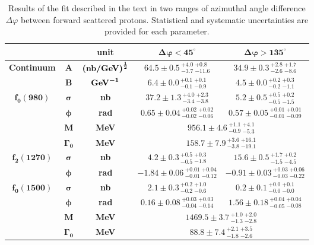 {
\renewcommand{\arraystretch}{1.5}
\begin{table}[]\centering
\begin{tabular}{ccc c c}%
~ & ~ & \bf{unit} & $\bm{\Delta\varphi<45^{\circ}}$ & $\bm{\Delta\varphi>135^{\circ}}$ \\ \hline\hline \multirow{2}{*}{\bf{Continuum}} & $\bm{A}$ & $\bm{\left(\text{\bf{nb/GeV}}\right)^{\frac{1}{2}}}$ & $64.5 \pm 0.5 \,^{+4.0}_{-3.7}\,^{+0.8}_{-11.6}$ & $34.9 \pm 0.3\,^{+2.8}_{-2.6}\,^{+1.7}_{-8.6}$ \\ %
& $\bm{B}$ & $\bm{\text{\bf{GeV}}^{-1}}$ & $6.4 \pm 0.0\,^{+0.1}_{-0.1} \,^{+0.1}_{-0.9}$ & $4.5 \pm 0.0\,^{+0.2}_{-0.2}\,^{+0.3}_{-1.1}$ \\ \hline
\multirow{4}{*}{$\bm{f_{0}(980)}$} & $\bm{\sigma}$ & \bf{nb} & $37.2 \pm 1.3 \,^{+4.0}_{-3.4}\,^{+2.3}_{-3.8}$ & $5.2 \pm 0.5\,^{+0.5}_{-0.5}\,^{+0.2}_{-1.5}$ \\
& $\bm{\phi}$ & \bf{rad} & $0.65 \pm 0.04\,^{+0.02}_{-0.02}\,^{+0.02}_{-0.06}$ & $0.57 \pm 0.05\,^{+0.01}_{-0.01}\,^{+0.01}_{-0.09}$ \\ %
& $\bm{M}$ & \bf{MeV} & \multicolumn{2}{c}{$956.1 \pm 4.6\,^{+1.1}_{-0.9} \,^{+4.1}_{-5.3}$} \\ %
& $\bm{\Gamma_{0}}$ & \bf{MeV} & \multicolumn{2}{c}{$158.7 \pm 7.9\,^{+3.6}_{-3.8} \,^{+16.1}_{-19.1}$} \\ \hline
\multirow{2}{*}{$\bm{f_{2}(1270)}$} & $\bm{\sigma}$ & \bf{nb} & $4.2 \pm 0.3 \,^{+0.5}_{-0.5}\,^{+0.3}_{-1.8}$ & $15.6 \pm 0.5\,^{+1.7}_{-1.5}\,^{+0.2}_{-4.5}$ \\ %
& $\bm{\phi}$ & \bf{rad} & $-1.84 \pm 0.06\,^{+0.01}_{-0.01}\,^{+0.04}_{-0.12}$ & $-0.91 \pm 0.03\,^{+0.03}_{-0.03}\,^{+0.06}_{-0.22}$ \\ \hline
\multirow{4}{*}{$\bm{f_{0}(1500)}$} & $\bm{\sigma}$ & \bf{nb} & $2.1 \pm 0.3 \,^{+0.2}_{-0.2}\,^{+1.0}_{-0.6}$ & $0.2 \pm 0.1\,^{+0.0}_{-0.0}\,^{+0.1}_{-0.0}$ \\ %
& $\bm{\phi}$ & \bf{rad} & $0.16 \pm 0.08\,^{+0.03}_{-0.04}\,^{+0.03}_{-0.14}$ & $1.56 \pm 0.18\,^{+0.04}_{-0.05}\,^{+0.04}_{-0.08}$ \\ %
& $\bm{M}$ & \bf{MeV} & \multicolumn{2}{c}{$1469.5 \pm 3.7\,^{+1.0}_{-1.3} \,^{+2.0}_{-2.8}$} \\ %
& $\bm{\Gamma_{0}}$ & \bf{MeV} & \multicolumn{2}{c}{$88.8 \pm 7.4\,^{+2.1}_{-1.8} \,^{+3.5}_{-2.6}$} \\ \hline
\end{tabular}
\caption{Results of the fit described in the text in two ranges of azimuthal angle difference $\Delta\varphi$ between forward scattered protons. Statistical and systematic uncertainties are provided for each parameter.}\label{tab:fitRes}\vspace{-5pt} %
\end{table}
}
